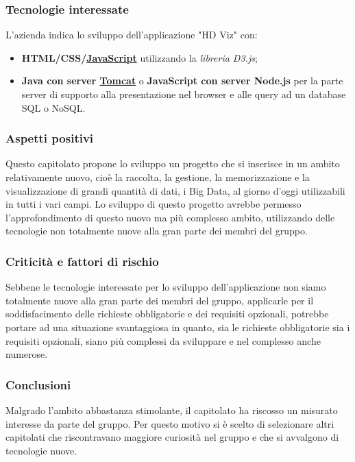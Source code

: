\subsubsection{Tecnologie interessate}
L'azienda indica lo sviluppo dell'applicazione "HD Viz" con:
\begin{itemize}
\item \textbf{HTML/CSS/\href{https://developer.mozilla.org/en-US/docs/Web/JavaScript/About_JavaScript}{JavaScript}} utilizzando la \textit{libreria D3.js};
\item \textbf{Java con server \href{http://tomcat.apache.org/}{Tomcat}} o \textbf{JavaScript con server Node.js} per la parte server di supporto alla presentazione nel browser e alle query ad un database SQL o NoSQL.
\end{itemize}
\subsubsection{Aspetti positivi}
Questo capitolato propone lo sviluppo un progetto che si inserisce in un ambito relativamente nuovo, cioè la raccolta, la gestione, la memorizzazione e la visualizzazione di grandi quantità di dati, i Big Data, al giorno d'oggi utilizzabili in tutti i vari campi.
Lo sviluppo di questo progetto avrebbe permesso l'approfondimento di questo nuovo ma più complesso ambito, utilizzando delle tecnologie non totalmente nuove alla gran parte dei membri del gruppo.
\subsubsection{Criticità e fattori di rischio}
Sebbene le tecnologie interessate per lo sviluppo dell'applicazione non siamo totalmente nuove alla gran parte dei membri del gruppo, applicarle per il soddisfacimento delle richieste obbligatorie e dei requisiti opzionali, potrebbe portare ad una situazione svantaggiosa in quanto, sia le richieste obbligatorie sia i requisiti opzionali, siano più complessi da sviluppare e nel complesso anche numerose.
\subsubsection{Conclusioni}
Malgrado l'ambito abbastanza stimolante, il capitolato ha riscosso un misurato interesse da parte del gruppo.
Per questo motivo si è scelto di selezionare altri capitolati che riscontravano maggiore curiosità nel gruppo e che si avvalgono di tecnologie nuove.